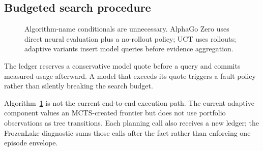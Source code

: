 \documentclass[10pt,twocolumn]{article}
\begin{document}
\subsection{Budgeted search procedure}

\begin{figure}[t]
\small
{}
\caption{Algorithm-name conditionals are unnecessary. AlphaGo Zero uses direct
neural evaluation plus a no-rollout policy; UCT uses rollouts; adaptive variants
insert model queries before evidence aggregation.}
\label{alg:method}
\end{figure}

The ledger reserves a conservative model quote before a query and commits
measured usage afterward. A model that exceeds its quote triggers a fault policy
rather than silently breaking the search budget.

Algorithm~\ref{alg:method} is not the current end-to-end execution path. The
current adaptive component values an MCTS-created frontier but does not use
portfolio observations as tree transitions. Each planning call also receives a
new ledger; the FrozenLake diagnostic sums those calls after the fact rather
than enforcing one episode envelope.
\end{document}
